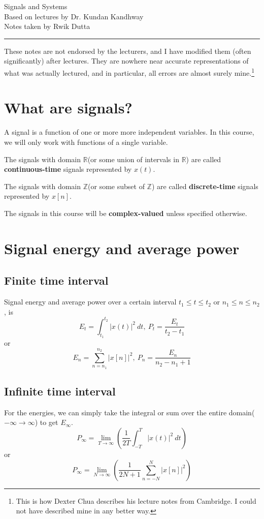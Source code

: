 \documentclass[10pt, a4paper]{extarticle}
\theoremstyle{definition}
\begin{document}
\begin{center}
	\fontsize{25}{60}\selectfont Signals and Systems \\
	\large Based on lectures by Dr. Kundan Kandhway\\
	Notes taken by Rwik Dutta
\end{center}
\hrule
\begin{center}
	These notes are not endorsed by the lecturers, and I have modified them (often
	significantly) after lectures. They are nowhere near accurate representations of what
	was actually lectured, and in particular, all errors are almost surely mine.\footnote[1]{This is how Dexter Chua describes his lecture notes from Cambridge. I could not have described mine in any better way.}
\end{center}
\tableofcontents

\newpage

\section{What are signals?}
A signal is a function of one or more more independent variables. In this course, we will only work with functions of a single variable.

The signals with domain $\mathbb{R}$(or some union of intervals in $\mathbb{R}$) are called \textbf{continuous-time} signals represented by $x(t)$.

The signals with domain $\mathbb{Z}$(or some subset of $\mathbb{Z}$) are called \textbf{discrete-time} signals represented by $x[n]$.

The signals in this course will be \textbf{complex-valued} unless specified otherwise.

\section{Signal energy and average power}
\subsection{Finite time interval}
Signal energy and average power over a certain interval $t_1\leq t\leq t_2$ or $n_1\leq n\leq n_2$, is
\[E_t=\int_{t_1}^{t_2}|x(t)|^2\ dt,\ P_t=\frac{E_t}{t_2-t_1}\]
or\[E_n=\sum_{n=n_1}^{n_2}|x[n]|^2,\ P_n=\frac{E_n}{n_2-n_1+1}\]

\subsection{Infinite time interval}
For the energies, we can simply take the integral or sum over the entire domain($-\infty\to\infty$) to get $E_\infty$.
\[P_{\infty}=\lim_{T\to\infty}\left(\frac{1}{2T}\int_{-T}^{T}|x(t)|^2\ dt\right)\]
or\[P_\infty=\lim_{N\to\infty}\left(\frac{1}{2N+1}\sum_{n=-N}^{N}|x[n]|^2\right)\]
\end{document}
